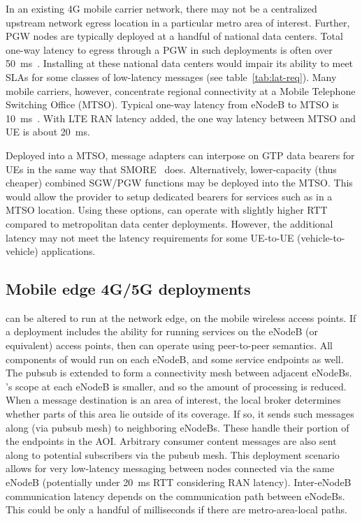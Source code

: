 In an existing 4G mobile carrier network, there may not be a
centralized upstream network egress location in a particular metro
area of interest. Further, PGW nodes are typically deployed at a
handful of national data centers.  Total one-way latency to egress
through a PGW in such deployments is often over
50~ms~\cite[Chapter~7]{grigorik2013high}. Installing \name at these national
data centers would impair its ability to meet SLAs for some classes of
low-latency messages (see table~\ref{tab:lat-req}). Many mobile
carriers, however, concentrate regional connectivity at a Mobile
Telephone Switching Office (MTSO).  Typical one-way latency from
eNodeB to MTSO is 10~ms~\cite{cho2014smore}. With LTE RAN latency
added, the one way latency between MTSO and UE is about 20~ms.

Deployed into a MTSO, \name message adapters can interpose on GTP
data bearers for UEs in the same way that SMORE~\cite{cho2014smore}
does. Alternatively, lower-capacity (thus cheaper) combined SGW/PGW
functions may be deployed into the MTSO. This would allow the provider
to setup dedicated bearers for services such as \name in a MTSO
location.  Using these options, \name can operate with slightly
higher RTT compared to metropolitan data center deployments.  However,
the additional latency may not meet the latency requirements for some
UE-to-UE (vehicle-to-vehicle) applications.

\subsection{Mobile edge 4G/5G deployments}

\name can be altered to run at the network edge, on the mobile
wireless access points.  If a deployment includes the ability for
running services on the eNodeB (or equivalent) access points, then
\name can operate using peer-to-peer semantics.  All components of
\name would run on each eNodeB, and some service endpoints as
well. The pubsub is extended to form a connectivity mesh between
adjacent eNodeBs. \name's scope at each eNodeB is smaller, and so
the amount of processing is reduced. When a message destination is an
area of interest, the local \name broker determines whether parts of
this area lie outside of its coverage.  If so, it sends such messages
along (via pubsub mesh) to neighboring eNodeBs. These handle their
portion of the endpoints in the AOI.  Arbitrary consumer content
messages are also sent along to potential subscribers via the pubsub
mesh.  This deployment scenario allows for very low-latency messaging
between nodes connected via the same eNodeB (potentially under 20~ms
RTT considering RAN latency). Inter-eNodeB communication latency
depends on the communication path between eNodeBs.  This could be only
a handful of milliseconds if there are metro-area-local paths.

